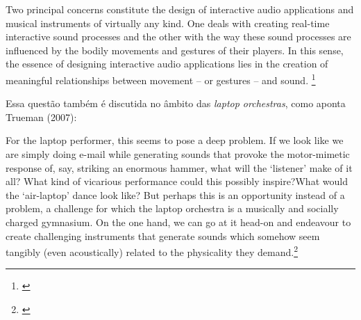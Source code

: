 \begin{citacao}
Two principal concerns constitute the design of interactive audio applications and musical instruments of virtually any kind. One deals with creating real-time interactive sound processes and the other with the way these sound processes are influenced by the bodily movements and gestures of their players. In this sense, the essence of designing interactive audio applications lies in the creation of meaningful relationships between movement – or gestures – and sound. \footnote{\cite{Schnell2013}}
\end{citacao}
Essa questão também é discutida no âmbito das \emph{laptop orchestras}, como aponta Trueman (2007):
\begin{citacao}
For the laptop performer, this seems to pose a
deep problem. If we look like we are simply doing e-mail while generating sounds that provoke the motor-mimetic response of, say, striking an enormous hammer, what will the ‘listener’ make of it all? What kind of vicarious performance could this possibly inspire?What would the ‘air-laptop’ dance look like? 
But perhaps this is an opportunity instead of a problem, a challenge for which the laptop orchestra is a musically and socially charged gymnasium. On the one hand, we can go at it head-on and endeavour to create challenging instruments that generate sounds which somehow seem tangibly (even acoustically) related to the physicality they demand.\footnote{\cite[6]{Trueman2007}}
\end{citacao}

